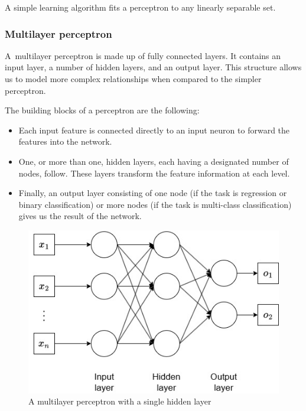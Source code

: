		
		A simple learning algorithm fits a perceptron to any linearly separable set.


		\bigskip
		\subsubsection{Multilayer perceptron}
		
		A multilayer perceptron is made up of fully connected layers. It contains an input layer, a number of hidden layers, and an output layer. This structure allows us to model more complex relationships when compared to the simpler perceptron. 
		
		The building blocks of a perceptron are the following:
		
		\begin{itemize}
			\item Each input feature is connected directly to an input neuron to forward the features into the network.
			\item One, or more than one, hidden layers, each having a designated number of nodes, follow. These layers transform the feature information at each level.
			\item Finally, an output layer consisting of one node (if the task is regression or binary classification) or more nodes (if the task is multi-class classification) gives us the result of the network.
		\end{itemize}
		\bigskip
		
		\begin{figure}[H]
			\centering
			\includegraphics[width=0.7\linewidth]{img/img-multilayer-perceptron}
			\caption{A multilayer perceptron with a single hidden layer}
			\label{fig:img-multilayer-perceptron}
		\end{figure}
		\bigskip
		
